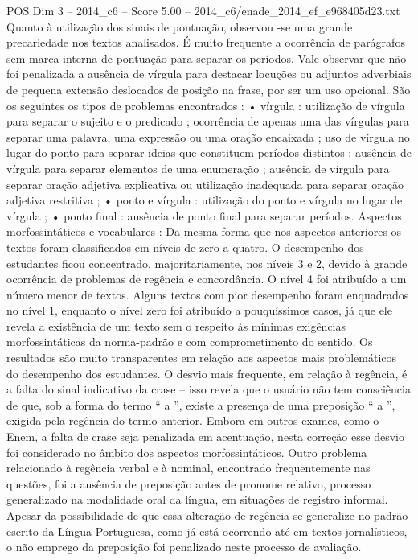 \begin{textsample}{POS Dim 3 – 2014\_c6 – Score 5.00 – 2014\_c6/enade\_2014\_ef\_e968405d23.txt}
Quanto à utilização dos sinais de pontuação, observou -se uma grande precariedade nos textos analisados.
É muito frequente a ocorrência de parágrafos sem marca interna de pontuação para separar os períodos.
Vale observar que não foi penalizada a ausência de vírgula para destacar locuções ou adjuntos adverbiais de pequena extensão deslocados de posição na frase, por ser um uso opcional.
São os seguintes os tipos de problemas encontrados : • vírgula : utilização de vírgula para separar o sujeito e o predicado ; ocorrência de apenas uma das vírgulas para separar uma palavra, uma expressão ou uma oração encaixada ; uso de vírgula no lugar do ponto para separar ideias que constituem períodos distintos ; ausência de vírgula para separar elementos de uma enumeração ; ausência de vírgula para separar oração adjetiva explicativa ou utilização inadequada para separar oração adjetiva restritiva ; • ponto e vírgula : utilização do ponto e vírgula no lugar de vírgula ; • ponto final : ausência de ponto final para separar períodos.
Aspectos morfossintáticos e vocabulares : Da mesma forma que nos aspectos anteriores os textos foram classificados em níveis de zero a quatro.
O desempenho dos estudantes ficou concentrado, majoritariamente, nos níveis 3 e 2, devido à grande ocorrência de problemas de regência e concordância.
O nível 4 foi atribuído a um número menor de textos.
Alguns textos com pior desempenho foram enquadrados no nível 1, enquanto o nível zero foi atribuído a pouquíssimos casos, já que ele revela a existência de um texto sem o respeito às mínimas exigências morfossintáticas da norma-padrão e com comprometimento do sentido.
Os resultados são muito transparentes em relação aos aspectos mais problemáticos do desempenho dos estudantes.
O desvio mais frequente, em relação à regência, é a falta do sinal indicativo da crase – isso revela que o usuário não tem consciência de que, sob a forma do termo “ a ”, existe a presença de uma preposição “ a ”, exigida pela regência do termo anterior.
Embora em outros exames, como o Enem, a falta de crase seja penalizada em acentuação, nesta correção esse desvio foi considerado no âmbito dos aspectos morfossintáticos.
Outro problema relacionado à regência verbal e à nominal, encontrado frequentemente nas questões, foi a ausência de preposição antes de pronome relativo, processo generalizado na modalidade oral da língua, em situações de registro informal.
Apesar da possibilidade de que essa alteração de regência se generalize no padrão escrito da Língua Portuguesa, como já está ocorrendo até em textos jornalísticos, o não emprego da preposição foi penalizado neste processo de avaliação.

\end{textsample}
